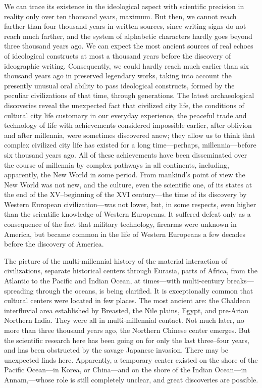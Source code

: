 We can trace its existence in the ideological aspect with scientific precision
in reality only over ten thousand years, maximum.  But then, we cannot reach
farther than four thousand years in written sources, since writing signs do not
reach much farther, and the system of alphabetic characters hardly goes beyond
three thousand years ago.  We can expect the most ancient sources of real
echoes of ideological constructs at most a thousand years before the discovery
of ideographic writing.  Consequently, we could hardly reach much earlier than
six thousand years ago in preserved legendary works, taking into account the
presently unusual oral ability to pass ideological constructs, formed by the
peculiar civilizations of that time, through generations.  The latest
archaeological discoveries reveal the unexpected fact that civilized city life,
the conditions of cultural city life customary in our everyday experience, the
peaceful trade and technology of life with achievements considered impossible
earlier, after oblivion and after millennia, were sometimes discovered anew;
they allow us to think that complex civilized city life has existed for a long
time---perhaps, millennia---before six thousand years ago.  All of these
achievements have been disseminated over the course of millennia by complex
pathways in all continents, including, apparently, the New World in some
period.  From mankind's point of view the New World was not new, and the
culture, even the scientific one, of its states at the end of the XV--beginning
of the XVI century---the time of its discovery by Western European
civilization---was not lower, but, in some respects, even higher than the
scientific knowledge of Western Europeans.  It suffered defeat only as a
consequence of the fact that military technology, firearms were unknown in
America, but became common in the life of Western Europeans a few decades
before the discovery of America.

The picture of the multi-millennial history of the material interaction of
civilizations, separate historical centers through Eurasia, parts of Africa,
from the Atlantic to the Pacific and Indian Ocean, at times---with
multi-century breaks---spreading through the oceans, is being clarified.  It is
exceptionally common that cultural centers were located in few places.  The
most ancient are: the Chaldean interfluvial area established by Breasted, the
Nile plains, Egypt, and pre-Arian Northern India.  They were all in
multi-millennial contact.  Not much later, no more than three thousand years
ago, the Northern Chinese center emerges.  But the scientific research here has
been going on for only the last three--four years, and has been obstructed by
the savage Japanese invasion.  There may be unexpected finds here.  Apparently,
a temporary center existed on the shore of the Pacific Ocean---in Korea, or
China---and on the shore of the Indian Ocean---in Annam,---whose role is still
completely unclear, and great discoveries are possible.


